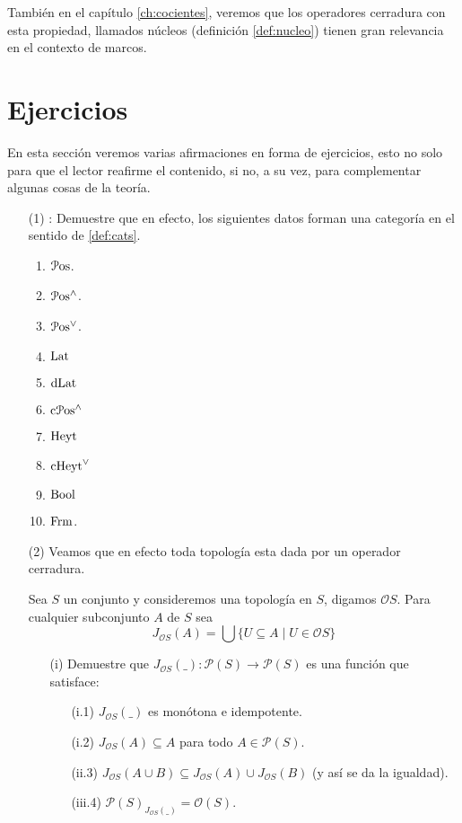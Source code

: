 También en el capítulo \ref{ch:cocientes}, veremos que
los operadores cerradura con esta propiedad, llamados núcleos
(definición \ref{def:nucleo}) tienen gran
relevancia en el contexto de marcos.


\section{Ejercicios}\label{exes}

En esta sección veremos varias afirmaciones en forma de ejercicios, esto no solo para que el lector reafirme el contenido, si no, a su vez, para complementar algunas cosas de la teoría.
\begin{itemize}
  \item[(1)]:
  Demuestre que en efecto, los siguientes datos forman una categoría en el sentido de \ref{def:cats}.
  \begin{enumerate}
    \item $\mathcal{P}\mathrm{os}$.
    \item $\mathcal{P}\mathrm{os}^{\wedge}$.
    \item $\mathcal{P}\mathrm{os}^{\vee}$.
    \item $\mathrm{Lat}$
    \item $\mathrm{dLat}$
    \item $\mathrm{c}\mathcal{P}\mathrm{os}^\wedge$
    \item $\mathrm{Heyt}$
    \item $\mathrm{cHeyt}^\vee$
    \item $\mathrm{Bool}$
    \item $\mathrm{Frm}$.
  
  \end{enumerate}
\item[(2)]
Veamos que en efecto toda topología esta dada por un operador cerradura.

   Sea $S$ un conjunto y consideremos una topología en $S$, digamos $\mathcal{O}S$.
  Para cualquier subconjunto $A$ de $S$ sea \[J_{\mathcal{O}S}(A)=\bigcup\{U\subseteq A\mid U\in\mathcal{O}S\}\]
  
\begin{enumerate}
  \item[(i)] Demuestre que $J_{\mathcal{O}S}(\_)\colon\mathcal{P}(S)\rightarrow\mathcal{P}(S)$ es una función que satisface:
  \begin{itemize}
    \item[(i.1)] $J_{\mathcal{O}S}(\_)$ es monótona e idempotente.
    \item[(i.2)] $J_{\mathcal{O}S}(A)\subseteq A$ para todo $A\in\mathcal{P}(S)$.
    \item[(ii.3)] $J_{\mathcal{O}S}(A\cup B)\subseteq J_{\mathcal{O}S}(A)\cup J_{\mathcal{O}S}(B)$ (y así se da la igualdad). 
    \item[(iii.4)] $\mathcal{P}(S)_{J_{\mathcal{O}S}(\_)}=\mathcal{O}(S)$. 
  \end{itemize} 
\end{enumerate}






\end{itemize}
